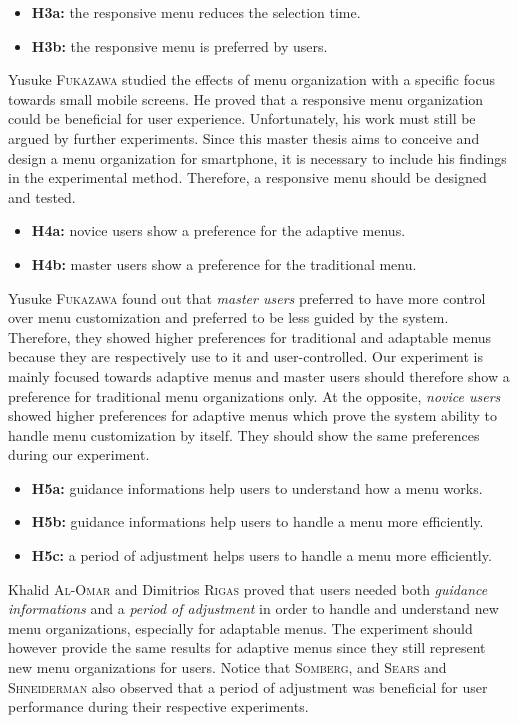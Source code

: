 \begin{itemize}
  \item \textbf{H3a:} the responsive menu reduces the selection time.
  \item \textbf{H3b:} the responsive menu is preferred by users.
\end{itemize}

Yusuke \textsc{Fukazawa} studied the effects of menu organization with a 
specific focus towards small mobile screens. He proved that a responsive menu 
organization could be beneficial for user experience. Unfortunately, his work 
must still be argued by further experiments. Since this master thesis aims to 
conceive and design a menu organization for smartphone, it is necessary to 
include his findings in the experimental method. Therefore, a responsive menu 
should be designed and tested.

\begin{itemize}
  \item \textbf{H4a:} novice users show a preference for the adaptive menus.
  \item \textbf{H4b:} master users show a preference for the traditional menu.
\end{itemize}

Yusuke \textsc{Fukazawa} found out that \textit{master users} preferred to have 
more 
control over menu customization and preferred to be less guided by the system. 
Therefore, they showed higher preferences for traditional and adaptable menus 
because they are respectively use to it and user-controlled. Our experiment is 
mainly focused towards adaptive menus and master users should therefore show a 
preference for traditional menu organizations only. At the opposite, 
\textit{novice users} showed higher preferences for adaptive menus which prove 
the system ability to handle menu customization by itself. They should show the 
same preferences during our experiment.

\begin{itemize}
  \item \textbf{H5a:} guidance informations help users to understand how a 
menu 
works.
  \item \textbf{H5b:} guidance informations help users to handle a menu more 
efficiently.
  \item \textbf{H5c:} a period of adjustment helps users to handle a menu more 
efficiently.
\end{itemize}

Khalid \textsc{Al-Omar} and Dimitrios \textsc{Rigas} proved that users needed 
both \textit{guidance informations} and a \textit{period of adjustment} in 
order to handle and understand new menu organizations, especially for adaptable 
menus. The experiment should however provide the same results for adaptive menus 
since they still represent new menu organizations for users. Notice that 
\textsc{Somberg}, and \textsc{Sears} and \textsc{Shneiderman} also observed 
that a period of adjustment was beneficial for user performance during their 
respective experiments.

